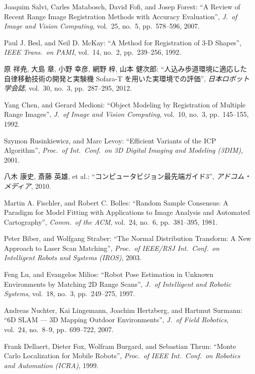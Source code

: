 \documentclass[uplatex, twocolumn, 9pt]{jsproceedings}
\begin{document}
\begin{thebibliography}{99}
Joaquim Salvi, Carles Matabosch, David Fofi, and Josep Forest: ``A Review of Recent Range Image Registration Methods with Accuracy Evaluation'', \textit{J.\ of Image and Vision Computing}, vol.~25, no.~5, pp.~578--596, 2007.

Paul J. Besl, and Neil D. McKay: ``A Method for Registration of 3-D Shapes'', \textit{IEEE Trans.\ on PAMI}, vol.~14, no.~2, pp.~239--256, 1992.

原 祥尭, 大島 章, 小野 幸彦, 網野 梓, 山本 健次郎: ``人込み歩道環境に適応した自律移動技術の開発と実験機 Sofara-T を用いた実環境での評価'', \textit{日本ロボット学会誌}, vol.~30, no.~3, pp.~287--295, 2012.

Yang Chen, and Gerard Medioni: ``Object Modeling by Registration of Multiple Range Images'', \textit{J.\ of Image and Vision Computing}, vol.~10, no.~3, pp.~145--155, 1992.

Szymon Rusinkiewicz, and Marc Levoy: ``Efficient Variants of the ICP Algorithm'', \textit{Proc.\ of Int.\ Conf.\ on 3D Digital Imaging and Modeling (3DIM)}, 2001.

八木 康史, 斎藤 英雄, et al.: ``コンピュータビジョン最先端ガイド3'', \textit{アドコム・メディア}, 2010.

Martin A. Fischler, and Robert C. Bolles: ``Random Sample Consensus: A Paradigm for Model Fitting with Applications to Image Analysis and Automated Cartography'', \textit{Comm.\ of the ACM}, vol.~24, no.~6, pp.~381--395, 1981.

Peter Biber, and Wolfgang Straber: ``The Normal Distribution Transform: A New Approach to Laser Scan Matching'', \textit{Proc.\ of IEEE/RSJ Int.\ Conf.\ on Intelligent Robots and Systems (IROS)}, 2003.

Feng Lu, and Evangelos Milios: ``Robot Pose Estimation in Unknown Environments by Matching 2D Range Scans'', \textit{J.\ of Intelligent and Robotic Systems}, vol.~18, no.~3, pp.~249--275, 1997.

Andreas Nuchter, Kai Lingemann, Joachim Hertzberg, and Hartmut Surmann: ``6D SLAM --- 3D Mapping Outdoor Environments'', \textit{J.\ of Field Robotics}, vol.~24, no.~8--9, pp.~699--722, 2007.

Frank Dellaert, Dieter Fox, Wolfram Burgard, and Sebastian Thrun: ``Monte Carlo Localization for Mobile Robots'', \textit{Proc.\ of IEEE Int.\ Conf.\ on Robotics and Automation (ICRA)}, 1999.


\end{thebibliography}
\end{document}

